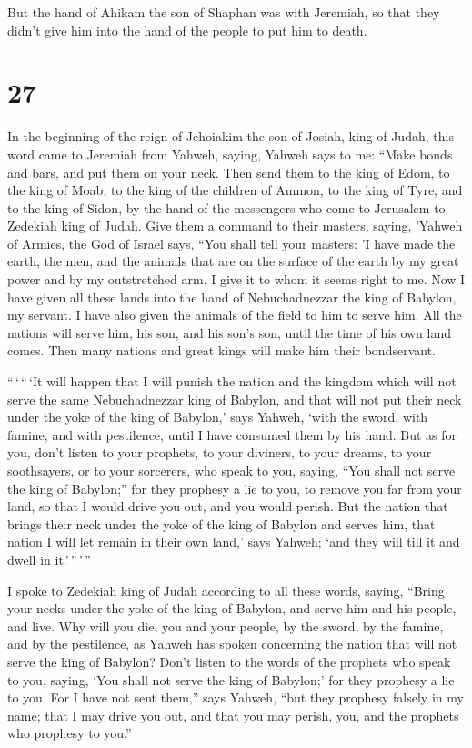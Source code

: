  But the hand of Ahikam the son of Shaphan was with
Jeremiah, so that they didn't give him into the hand of the people to
put him to death.

\hypertarget{section-26}{%
\section{27}\label{section-26}}

 In the beginning of the reign of Jehoiakim the son of
Josiah, king of Judah, this word came to Jeremiah from Yahweh, saying,
 Yahweh says to me: ``Make bonds and bars, and put them on
your neck.  Then send them to the king of Edom, to the
king of Moab, to the king of the children of Ammon, to the king of Tyre,
and to the king of Sidon, by the hand of the messengers who come to
Jerusalem to Zedekiah king of Judah.  Give them a command
to their masters, saying, 'Yahweh of Armies, the God of Israel says,
``You shall tell your masters:  'I have made the earth,
the men, and the animals that are on the surface of the earth by my
great power and by my outstretched arm. I give it to whom it seems right
to me.  Now I have given all these lands into the hand of
Nebuchadnezzar the king of Babylon, my servant. I have also given the
animals of the field to him to serve him.  All the nations
will serve him, his son, and his son's son, until the time of his own
land comes. Then many nations and great kings will make him their
bondservant.

 ``\,`\,``\,`It will happen that I will punish the nation
and the kingdom which will not serve the same Nebuchadnezzar king of
Babylon, and that will not put their neck under the yoke of the king of
Babylon,' says Yahweh, `with the sword, with famine, and with
pestilence, until I have consumed them by his hand.  But
as for you, don't listen to your prophets, to your diviners, to your
dreams, to your soothsayers, or to your sorcerers, who speak to you,
saying, ``You shall not serve the king of Babylon;''  for
they prophesy a lie to you, to remove you far from your land, so that I
would drive you out, and you would perish.  But the
nation that brings their neck under the yoke of the king of Babylon and
serves him, that nation I will let remain in their own land,' says
Yahweh; `and they will till it and dwell in it.'\,''\,'\,''

 I spoke to Zedekiah king of Judah according to all these
words, saying, ``Bring your necks under the yoke of the king of Babylon,
and serve him and his people, and live.  Why will you
die, you and your people, by the sword, by the famine, and by the
pestilence, as Yahweh has spoken concerning the nation that will not
serve the king of Babylon?  Don't listen to the words of
the prophets who speak to you, saying, `You shall not serve the king of
Babylon;' for they prophesy a lie to you.  For I have not
sent them,'' says Yahweh, ``but they prophesy falsely in my name; that I
may drive you out, and that you may perish, you, and the prophets who
prophesy to you.''

